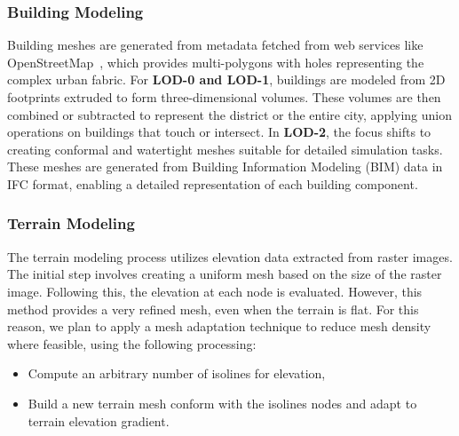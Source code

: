 \documentclass[runningheads]{llncs}
\begin{document}
\subsubsection{Building Modeling}
Building meshes are generated from metadata fetched from web services like OpenStreetMap~\cite{openstreetmap_contributors_planet_2017}, which provides multi-polygons with holes representing the complex urban fabric. For \textbf{LOD-0 and LOD-1}, buildings are modeled from 2D footprints extruded to form three-dimensional volumes. These volumes are then combined or subtracted to represent the district or the entire city, applying union operations on buildings that touch or intersect. In \textbf{LOD-2}, the focus shifts to creating conformal and watertight meshes suitable for detailed simulation tasks. These meshes are generated from Building Information Modeling (BIM) data in IFC format, enabling a detailed representation of each building component.



\subsubsection{Terrain Modeling}
The terrain modeling process utilizes elevation data extracted from raster images. The initial step involves creating a uniform mesh based on the size of the raster image. Following this, the elevation at each node is evaluated.
However, this method provides a very refined mesh, even when the terrain is flat. For this reason, we plan to apply a mesh adaptation technique to reduce mesh density where feasible, using the following processing:
\begin{itemize}
    \item Compute an arbitrary number of isolines for elevation,
    \item Build a new terrain mesh conform with the isolines nodes and adapt to terrain elevation gradient.
\end{itemize}
\end{document}
